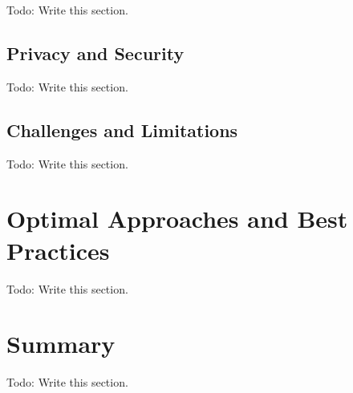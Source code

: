 Todo: Write this section.

\subsection{Privacy and Security}

Todo: Write this section.

\subsection{Challenges and Limitations}

Todo: Write this section.

\section{Optimal Approaches and Best Practices}

Todo: Write this section.

\section{Summary}

Todo: Write this section.